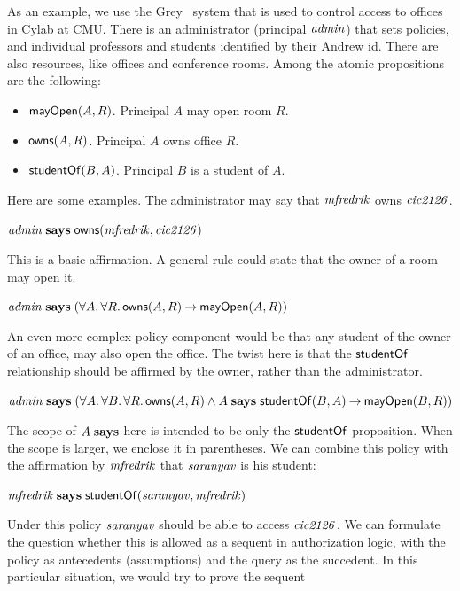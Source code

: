\documentclass[11pt]{article}
\begin{document}
As an example, we use the Grey~\citep{Bauer05isc} system that is used to control
access to offices in Cylab at CMU\@.  There is an administrator (principal
$\mathit{admin}$) that sets policies, and individual professors and students
identified by their Andrew id.  There are also resources, like offices and
conference rooms.  Among the atomic propositions are the following:
\begin{itemize}
\item $\mathsf{mayOpen}(A, R)$.  Principal $A$ may open room $R$.
\item $\mathsf{owns}(A, R)$.  Principal $A$ owns office $R$.
\item $\mathsf{studentOf}(B, A)$.  Principal $B$ is a student of $A$.
\end{itemize}
Here are some examples.  The administrator may say that $\mathit{mfredrik}$ owns
$\mathit{cic2126}$.
\begin{tabbing}
  \quad $\mathit{admin} \mathrel{\mathbf{says}} \mathsf{owns}(\mathit{mfredrik}, \mathit{cic2126})$
\end{tabbing}
This is a basic affirmation.  A general rule could state that the owner of a
room may open it.
\begin{tabbing}
  \quad $\mathit{admin} \mathrel{\mathbf{says}} (\forall A.\, \forall R.\, \mathsf{owns}(A, R) \mathbin{\rightarrow} \mathsf{mayOpen}(A, R))$
\end{tabbing}
An even more complex policy component would be that any student of the owner of
an office, may also open the office.  The twist here is that the
$\mathsf{studentOf}$ relationship should be affirmed by the owner, rather than the
administrator.
\begin{tabbing}
  \quad $\mathit{admin} \mathrel{\mathbf{says}} (\forall A.\, \forall B.\, \forall R.\, \mathsf{owns}(A, R)
  \land A \mathrel{\mathbf{says}} \mathsf{studentOf}(B, A) \mathbin{\rightarrow} \mathsf{mayOpen}(B, R))$
\end{tabbing}
The scope of $A \mathrel{\mathbf{says}}$ here is intended to be only the $\mathsf{studentOf}$
proposition.  When the scope is larger, we enclose it in parentheses.  We can
combine this policy with the affirmation by $\mathit{mfredrik}$ that $\mathit{saranyav}$ is
his student:
\begin{tabbing}
  \quad $\mathit{mfredrik} \mathrel{\mathbf{says}} \mathsf{studentOf}(\mathit{saranyav}, \mathit{mfredrik})$
\end{tabbing}
Under this policy $\mathit{saranyav}$ should be able to access $\mathit{cic2126}$.  We can
formulate the question whether this is allowed as a sequent in authorization
logic, with the policy as antecedents (assumptions) and the query as the
succedent.  In this particular situation, we would try to prove the sequent
\end{document}
